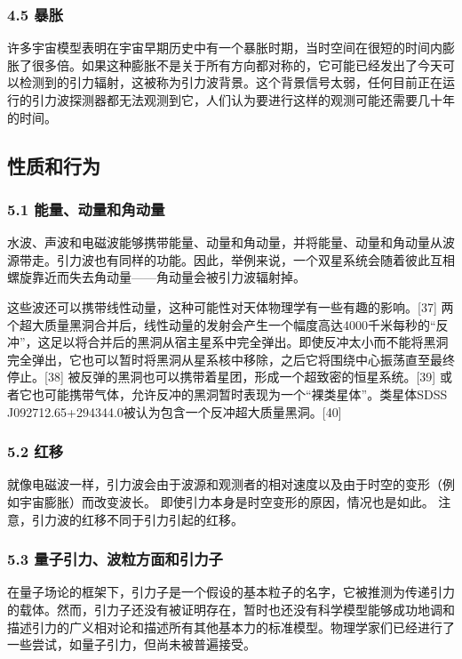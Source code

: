 \subsubsection{4.5 暴胀}

许多宇宙模型表明在宇宙早期历史中有一个暴胀时期，当时空间在很短的时间内膨胀了很多倍。如果这种膨胀不是关于所有方向都对称的，它可能已经发出了今天可以检测到的引力辐射，这被称为引力波背景。这个背景信号太弱，任何目前正在运行的引力波探测器都无法观测到它，人们认为要进行这样的观测可能还需要几十年的时间。

\subsection{性质和行为}

\subsubsection{5.1 能量、动量和角动量}

水波、声波和电磁波能够携带能量、动量和角动量，并将能量、动量和角动量从波源带走。引力波也有同样的功能。因此，举例来说，一个双星系统会随着彼此互相螺旋靠近而失去角动量——角动量会被引力波辐射掉。

这些波还可以携带线性动量，这种可能性对天体物理学有一些有趣的影响。[37] 两个超大质量黑洞合并后，线性动量的发射会产生一个幅度高达4000千米每秒的“反冲”，这足以将合并后的黑洞从宿主星系中完全弹出。即使反冲太小而不能将黑洞完全弹出，它也可以暂时将黑洞从星系核中移除，之后它将围绕中心振荡直至最终停止。[38] 被反弹的黑洞也可以携带着星团，形成一个超致密的恒星系统。[39] 或者它也可能携带气体，允许反冲的黑洞暂时表现为一个“裸类星体”。类星体SDSS J092712.65+294344.0被认为包含一个反冲超大质量黑洞。[40]

\subsubsection{5.2 红移}

就像电磁波一样，引力波会由于波源和观测者的相对速度以及由于时空的变形（例如宇宙膨胀）而改变波长。 即使引力本身是时空变形的原因，情况也是如此。 注意，引力波的红移不同于引力引起的红移。

\subsubsection{5.3 量子引力、波粒方面和引力子}

在量子场论的框架下，引力子是一个假设的基本粒子的名字，它被推测为传递引力的载体。然而，引力子还没有被证明存在，暂时也还没有科学模型能够成功地调和描述引力的广义相对论和描述所有其他基本力的标准模型。物理学家们已经进行了一些尝试，如量子引力，但尚未被普遍接受。

